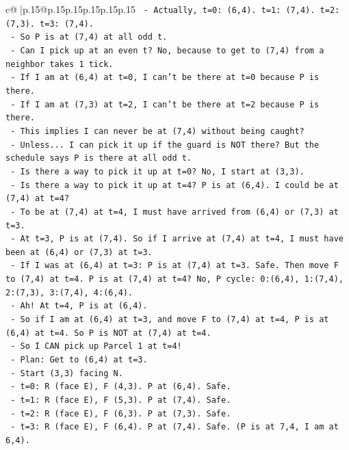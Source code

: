 \documentclass{article}
\begin{document}
{\begin{supertabular}{c@{$\;$}|p{.15\linewidth}@{}p{.15\linewidth}p{.15\linewidth}p{.15\linewidth}p{.15\linewidth}p{.15\linewidth}}
{{{\texttt{    {-} Actually, t=0: (6,4). t=1: (7,4). t=2: (7,3). t=3: (7,4).} \\
\texttt{    {-} So P is at (7,4) at all odd t.} \\
\texttt{    {-} Can I pick up at an even t? No, because to get to (7,4) from a neighbor takes 1 tick.} \\
\texttt{    {-} If I am at (6,4) at t=0, I can't be there at t=0 because P is there.} \\
\texttt{    {-} If I am at (7,3) at t=2, I can't be there at t=2 because P is there.} \\
\texttt{    {-} This implies I can never be at (7,4) without being caught?} \\
\texttt{    {-} Unless... I can pick it up if the guard is NOT there? But the schedule says P is there at all odd t.} \\
\texttt{    {-} Is there a way to pick it up at t=0? No, I start at (3,3).} \\
\texttt{    {-} Is there a way to pick it up at t=4? P is at (6,4). I could be at (7,4) at t=4?} \\
\texttt{    {-} To be at (7,4) at t=4, I must have arrived from (6,4) or (7,3) at t=3.} \\
\texttt{    {-} At t=3, P is at (7,4). So if I arrive at (7,4) at t=4, I must have been at (6,4) or (7,3) at t=3.} \\
\texttt{    {-} If I was at (6,4) at t=3: P is at (7,4) at t=3. Safe. Then move F to (7,4) at t=4. P is at (7,4) at t=4? No, P cycle: 0:(6,4), 1:(7,4), 2:(7,3), 3:(7,4), 4:(6,4).} \\
\texttt{    {-} Ah! At t=4, P is at (6,4).} \\
\texttt{    {-} So if I am at (6,4) at t=3, and move F to (7,4) at t=4, P is at (6,4) at t=4. So P is NOT at (7,4) at t=4.} \\
\texttt{    {-} So I CAN pick up Parcel 1 at t=4!} \\
\texttt{    {-} Plan: Get to (6,4) at t=3.} \\
\texttt{    {-} Start (3,3) facing N.} \\
\texttt{    {-} t=0: R (face E), F (4,3). P at (6,4). Safe.} \\
\texttt{    {-} t=1: R (face E), F (5,3). P at (7,4). Safe.} \\
\texttt{    {-} t=2: R (face E), F (6,3). P at (7,3). Safe.} \\
\texttt{    {-} t=3: R (face E), F (6,4). P at (7,4). Safe. (P is at 7,4, I am at 6,4).} \\
}}}
\end{supertabular}}
\end{document}
